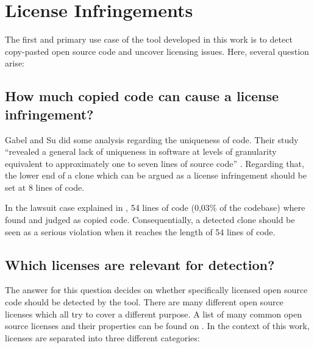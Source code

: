 \section{License Infringements}\label{section:preliminaries/infringement}
The first and primary use case of the tool developed in this work is to detect copy-pasted open source code and uncover licensing issues.
Here, several question arise:

\subsection*{How much copied code can cause a license infringement?}\label{section:preliminaries/infringement/how_much_code}
Gabel and Su did some analysis regarding the uniqueness of code.
Their study ``revealed a general lack of uniqueness in software at levels of granularity equivalent to approximately one to seven lines of source code'' \cite{2010-gabel-su-source-code-uniqueness}.
Regarding that, the lower end of a clone which can be argued as a license infringement should be set at 8 lines of code.

In the lawsuit case explained in \cite{mertzel2008copying}, 54 lines of code (0,03\% of the codebase) where found and judged as copied code.
Consequentially, a detected clone should be seen as a serious violation when it reaches the length of 54 lines of code.

\subsection*{Which licenses are relevant for detection?}\label{section:preliminaries/infringement/relevant_licenses}
The answer for this question decides on whether specifically licensed open source code should be detected by the tool.
There are many different open source licenses which all try to cover a different purpose.
A list of many common open source licenses and their properties can be found on \cite{licenses}.
In the context of this work, licenses are separated into three different categories:

